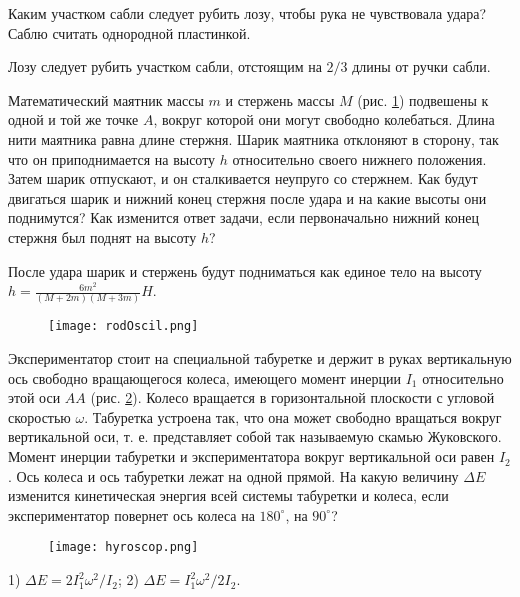 \begin{ex}  %
Каким участком сабли следует рубить лозу, чтобы рука не чувствовала удара? Саблю считать однородной пластинкой.
\begin{ans}
Лозу следует рубить участком сабли, отстоящим на $2/3$ длины от ручки сабли.
\end{ans}
\end{ex}	

\begin{ex} %
Математический маятник массы $m$ и стержень массы $M$ (рис. \ref{rodOscil}) подвешены к одной и той же точке $A$, вокруг которой они могут свободно колебаться. Длина нити маятника равна длине стержня. Шарик маятника отклоняют в сторону, так что он приподнимается на высоту $h$ относительно своего нижнего положения. Затем шарик отпускают, и он сталкивается неупруго со стержнем. Как будут двигаться шарик и нижний конец стержня после удара и на какие высоты они поднимутся? Как изменится ответ задачи, если первоначально нижний конец стержня был поднят на высоту $h$?
\begin{ans}
После удара шарик и стержень будут подниматься как единое тело на высоту $h = \frac{6m^2}{(M+2m)(M+3m)}H$.
\end{ans}
\end{ex}	

\begin{figure}[h]
\centering
\texttt{[image: rodOscil.png]}
\caption{}
\label{rodOscil}
\end{figure}

\begin{ex} %
Экспериментатор стоит на специальной табуретке и держит в руках вертикальную ось свободно вращающегося колеса, имеющего момент инерции $I_1$ относительно этой оси $AA$ (рис. \ref{hyroscop}). Колесо вращается в горизонтальной плоскости с угловой скоростью $\omega$. Табуретка устроена так, что она может свободно вращаться вокруг вертикальной оси, т. е. представляет собой так называемую скамью Жуковского. Момент инерции табуретки и экспериментатора вокруг вертикальной оси равен $I_2$. Ось колеса и ось табуретки лежат на одной прямой. На какую величину $\Delta E$ изменится кинетическая энергия всей системы табуретки и колеса, если экспериментатор повернет ось колеса на $180^{\circ}$, на $90^{\circ}$?

\begin{figure}[h]
\centering
\texttt{[image: hyroscop.png]}
\caption{}
\label{hyroscop}
\end{figure}

\begin{ans}
1) $\Delta E = 2I_1^2\omega^2/I_2$; 2) $\Delta E = I_1^2\omega^2/2I_2$.
\end{ans}
\end{ex}	

